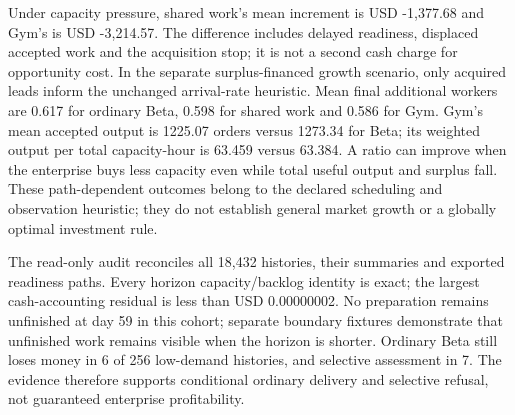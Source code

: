 Under capacity pressure, shared work's mean increment is USD -1,377.68 and Gym's is USD -3,214.57. The difference includes delayed readiness, displaced accepted work and the acquisition stop; it is not a second cash charge for opportunity cost. In the separate surplus-financed growth scenario, only acquired leads inform the unchanged arrival-rate heuristic. Mean final additional workers are 0.617 for ordinary Beta, 0.598 for shared work and 0.586 for Gym. Gym's mean accepted output is 1225.07 orders versus 1273.34 for Beta; its weighted output per total capacity-hour is 63.459 versus 63.384. A ratio can improve when the enterprise buys less capacity even while total useful output and surplus fall. These path-dependent outcomes belong to the declared scheduling and observation heuristic; they do not establish general market growth or a globally optimal investment rule.

The read-only audit reconciles all 18,432 histories, their summaries and exported readiness paths. Every horizon capacity/backlog identity is exact; the largest cash-accounting residual is less than USD 0.00000002. No preparation remains unfinished at day 59 in this cohort; separate boundary fixtures demonstrate that unfinished work remains visible when the horizon is shorter. Ordinary Beta still loses money in 6 of 256 low-demand histories, and selective assessment in 7. The evidence therefore supports conditional ordinary delivery and selective refusal, not guaranteed enterprise profitability.
